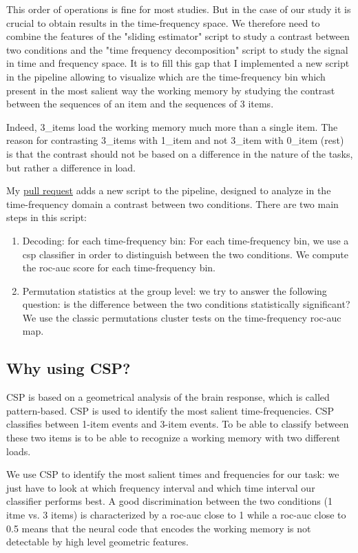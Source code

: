 This order of operations is fine for most studies. But in the case of our study it is crucial to obtain results in the time-frequency space. We therefore need to combine the features of the "sliding estimator" script to study a contrast between two conditions and the "time frequency decomposition" script to study the signal in time and frequency space. It is to fill this gap that I implemented a new script in the pipeline allowing to visualize which are the time-frequency bin which present in the most salient way the working memory by studying the contrast between the sequences of an item and the sequences of 3 items. 

Indeed, 3\_items load the working memory much more than a single item. The reason for contrasting 3\_items with 1\_item and not 3\_item with 0\_item (rest) is that the contrast should not be based on a difference in the nature of the tasks, but rather a difference in load.

My \href{https://github.com/mne-tools/mne-bids-pipeline/pull/414}{pull request} adds a new script to the pipeline, designed to analyze in the time-frequency domain a contrast between two conditions. There are two main steps in this script:
\begin{enumerate}
    \item Decoding: for each time-frequency bin: For each time-frequency bin, we use a csp classifier in order to distinguish between the two conditions. We compute the roc-auc score for each time-frequency bin.
    \item Permutation statistics at the group level: we try to answer the following question: is the difference between the two conditions statistically significant? We use the classic permutations cluster tests on the time-frequency roc-auc map.
\end{enumerate}

\subsection{Why using CSP?}

CSP is based on a geometrical analysis of the brain response, which is called pattern-based. CSP is used to identify the most salient time-frequencies. CSP classifies between 1-item events and 3-item events. To be able to classify between these two items is to be able to recognize a working memory with two different loads.

We use CSP to identify the most salient times and frequencies for our task: we just have to look at which frequency interval and which time interval our classifier performs best. A good discrimination between the two conditions (1 itme vs. 3 items) is characterized by a roc-auc close to 1 while a roc-auc close to 0.5 means that the neural code that encodes the working memory is not detectable by high level geometric features.


